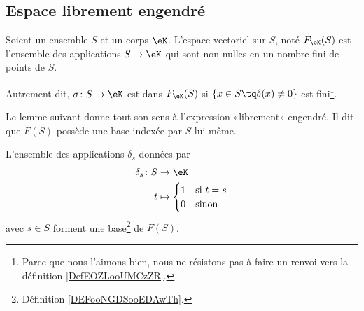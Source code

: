 \subsection{Espace librement engendré}

\begin{definition}       \label{DEFooCPNIooNxsYMY}
    Soient un ensemble \( S\) et un corps \(\eK \). L'espace vectoriel  sur \( S\), noté \( F_{\eK}(S)\) est l'ensemble des applications \( S\to \eK\) qui sont non-nulles en un nombre fini de points de \( S\).

    Autrement dit, \( \sigma\colon S\to \eK\) est dans \( F_{\eK}(S) \) si \( \{ x\in S\tq \delta(x)\neq 0 \}\) est fini\footnote{Parce que nous l'aimons bien, nous ne résistons pas à faire un renvoi vers la définition \ref{DefEOZLooUMCzZR}.}.
\end{definition}

Le lemme suivant donne tout son sens à l'expression «librement» engendré. Il dit que \( F(S)\) possède une base indexée par \( S\) lui-même.
\begin{lemma}       \label{LEMooLOPAooUNQVku}
    L'ensemble des applications \( \delta_s\) données par
    \begin{equation}
        \begin{aligned}
            \delta_s\colon S&\to \eK \\
            t&\mapsto \begin{cases}
                1    &   \text{si } t=s\\
                0    &    \text{sinon }
            \end{cases}
        \end{aligned}
    \end{equation}
    avec \( s\in S\) forment une base\footnote{Définition \ref{DEFooNGDSooEDAwTh}.} de \( F(S)\).
\end{lemma}

